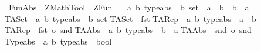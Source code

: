 %
\begin{isabellebody}%
\def\isabellecontext{FunAbs}%
%
\isamarkuptrue%
%
\isadelimtheory
%
\endisadelimtheory
%
\isatagtheory
{}\isamarkupfalse%
\ FunAbs\ \ ZMathTool\ \ ZFun\ %
\endisatagtheory
{\isafoldtheory}%
%
\isadelimtheory
%
\endisadelimtheory
\isanewline
\isanewline
\isanewline
{}\isamarkupfalse%
\isanewline
\isanewline
\ \ {\isacharparenleft}{\isacharprime}a{\isacharcomma}\ {\isacharprime}b{\isacharparenright}\ typeabs\ {\isacharequal}\ {\isachardoublequoteopen}{\isacharparenleft}{\isacharprime}b\ set{\isacharparenright}\ {\isacharasterisk}\ {\isacharparenleft}{\isacharprime}a\ {\isacharequal}{\isachargreater}\ {\isacharprime}b{\isacharparenright}\ {\isacharasterisk}\ {\isacharparenleft}{\isacharprime}b\ {\isacharequal}{\isachargreater}\ {\isacharprime}a{\isacharparenright}{\isachardoublequoteclose}\isanewline
\isanewline
{}\isamarkupfalse%
\isanewline
\isanewline
\isanewline
\isanewline
TASet\ {\isacharcolon}{\isacharcolon}\ {\isachardoublequoteopen}{\isacharparenleft}{\isacharprime}a{\isacharcomma}\ {\isacharprime}b{\isacharparenright}\ typeabs\ {\isacharequal}{\isachargreater}\ {\isacharparenleft}{\isacharprime}b\ set{\isacharparenright}{\isachardoublequoteclose}\isanewline
{\isachardoublequoteopen}TASet\ {\isacharequal}{\isacharequal}\ fst{\isachardoublequoteclose}\isanewline
\isanewline
TARep\ {\isacharcolon}{\isacharcolon}\ {\isachardoublequoteopen}{\isacharparenleft}{\isacharprime}a{\isacharcomma}\ {\isacharprime}b{\isacharparenright}\ typeabs\ {\isacharequal}{\isachargreater}\ {\isacharparenleft}{\isacharprime}a\ {\isacharequal}{\isachargreater}\ {\isacharprime}b{\isacharparenright}{\isachardoublequoteclose}\isanewline
{\isachardoublequoteopen}TARep\ {\isacharequal}{\isacharequal}\ fst\ o\ snd{\isachardoublequoteclose}\isanewline
\isanewline
TAAbs\ {\isacharcolon}{\isacharcolon}\ {\isachardoublequoteopen}{\isacharparenleft}{\isacharprime}a{\isacharcomma}\ {\isacharprime}b{\isacharparenright}\ typeabs\ {\isacharequal}{\isachargreater}\ {\isacharparenleft}{\isacharprime}b\ {\isacharequal}{\isachargreater}\ {\isacharprime}a{\isacharparenright}{\isachardoublequoteclose}\isanewline
{\isachardoublequoteopen}TAAbs\ {\isacharequal}{\isacharequal}\ snd\ o\ snd{\isachardoublequoteclose}\isanewline
\isanewline
Typeabs\ {\isacharcolon}{\isacharcolon}\ {\isachardoublequoteopen}{\isacharparenleft}{\isacharprime}a{\isacharcomma}\ {\isacharprime}b{\isacharparenright}\ typeabs\ {\isacharequal}{\isachargreater}\ bool{\isachardoublequoteclose}\isanewline

\end{isabellebody}
